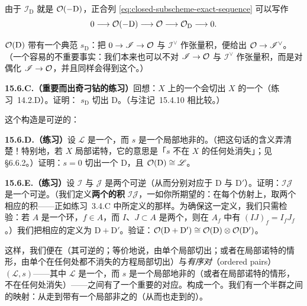 由于\trIdealSheaf{} $\mathscr{I}_{\mathrm{D}}$ 就是 $\mathcal{O}(-\mathrm{D})$，\trClosedSubscheme{}正合列 \eqref{eq:closed-subscheme-exact-sequence} 可以写作
\[
0\longrightarrow\mathcal{O}(-\mathrm{D})\longrightarrow\mathcal{O}\longrightarrow\mathcal{O}_{\mathrm{D}}\longrightarrow 0.
\]

\trInvertibleSheaf{} $\mathcal{O}(\mathrm{D})$ 带有一个典范\trSection{} $s_{\mathrm{D}}$：把 $0\to\mathscr{I}\to\mathcal{O}$ 与 $\mathscr{I}^{\vee}$ 作张量积，便给出 $\mathcal{O}\to\mathscr{I}^{\vee}$。（一个容易的不重要事实：我们本来也可以不对 $\mathscr{I}\to\mathcal{O}$ 与 $\mathscr{I}^{\vee}$ 作张量积，而是对偶化 $\mathscr{I}\to\mathcal{O}$，并且同样会得到这个\trSection。）

\textbf{15.6.C.（重要而出奇刁钻的练习）}\quad 回想：$X$ 上\trLocallyFreeSheaf{}的一个\trSection{}会切出 $X$ 的一个\trClosedSubscheme（\mbox{练习~14.2.D}）。证明：\trSection{} $s_{\mathrm{D}}$ 切出 $\mathrm{D}$。（与\mbox{注记~15.4.10} 相比较。）

这个构造是可逆的：

\textbf{15.6.D.（练习）}\quad 设 $\mathscr{L}$ 是一个\trInvertibleSheaf，而 $s$ 是一个局部地非\trZerodivisor{}的\trSection。（把这句话的含义弄清楚！特别地，若 $X$ 局部诺特，它的意思是「$s$ 不在 $X$ 的任何\trAssociatedPoint{}处消失」；见 \S6.6.2。）证明：$s=0$ 切出一个\trEffectiveCartierDivisor{} $\mathrm{D}$，且 $\mathcal{O}(\mathrm{D})\cong\mathscr{L}$。

\textbf{15.6.E.（练习）}\quad 设 $\mathscr{I}$ 与 $\mathscr{J}$ 是两个可逆\trIdealSheaf（从而分别对应于\trEffectiveCartierDivisor{} $\mathrm{D}$ 与 $\mathrm{D}'$）。证明：$\mathscr{I}\mathscr{J}$ 是一个可逆\trIdealSheaf。（我们定义\textbf{两个\trQC\trIdealSheaf{}的积} $\mathscr{I}\mathscr{J}$，一如你所期望的：在每个仿射上，取两个相应\trIdeal{}的积——正如\mbox{练习~3.4.C} 中所定义的那样。为确保这一定义\trWellDefined，我们只需检验：若 $A$ 是一个环，$f\in A$，而 $I$、$J\subset A$ 是两个\trIdeal，则在 $A_f$ 中有 $(IJ)_f=I_fJ_f$。）我们把相应的\trCartierDivisor{}定义为 $\mathrm{D}+\mathrm{D}'$。验证：$\mathcal{O}(\mathrm{D}+\mathrm{D}')\cong\mathcal{O}(\mathrm{D})\otimes\mathcal{O}(\mathrm{D}')$。

这样，我们便在\emph{\trEffectiveCartierDivisor}（其\trIdealSheaf{}可逆的\trClosedSubscheme；等价地说，由单个\trNonZerodivisor{}局部切出；或者在局部诺特的情形，由单个在任何\trAssociatedPoint{}处都不消失的方程局部切出）与\emph{有序对}（ordered pairs）$(\mathscr{L},s)$——其中 $\mathscr{L}$ 是一个\trInvertibleSheaf，而 $s$ 是一个局部地非\trZerodivisor{}的\trSection（或者在局部诺特的情形，不在任何\trAssociatedPoint{}处消失）——之间有了一个重要的对应。\trEffectiveCartierDivisor{}构成一个\trAbelianSemigroup。我们有一个半群之间的映射：从\trEffectiveCartierDivisor{}走到带有一个局部非\trZerodivisor{}之\trSection{}的\trInvertibleSheaf（从而也走到\trInvertibleSheaf{}的\trPicardGroup）。

